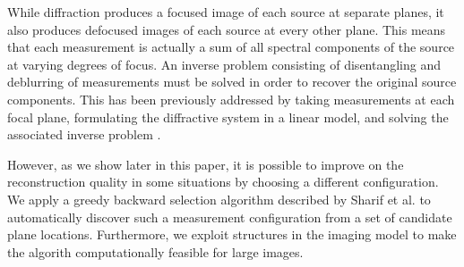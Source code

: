 \documentclass{article}
\begin{document}
While diffraction produces a focused image of each source at separate
planes, it also produces defocused images of each source at every other plane.
This means that each measurement is actually a sum of all spectral components of
the source at varying degrees of focus. An inverse problem consisting of
disentangling and deblurring of measurements must be solved in order to
recover the original source components.  This has been
previously addressed by taking measurements at each focal plane, formulating the
diffractive system in a linear model, and solving the associated inverse problem
\cite{oktem2014icip}.



However, as we show later in this paper, it is possible to improve on the
reconstruction quality in some situations by choosing a different configuration.
We apply a greedy backward selection algorithm described by
Sharif et al. \cite{sharif} to automatically discover such a measurement
configuration from a set of candidate plane locations. Furthermore, we exploit
structures in the imaging model to make the algorith computationally feasible
for large images.
\end{document}
